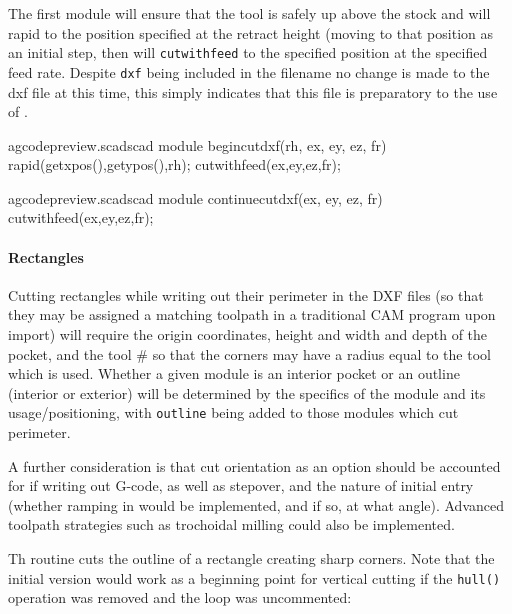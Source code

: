 \documentclass{ltxdoc}
\begin{document}
The first module will ensure that the tool is safely up above
the stock and will rapid to the position specified at the retract height (moving to that 
position as an initial step, then will \texttt{cutwithfeed} to the specified position
at the specified feed rate. Despite \texttt{dxf} being included in the filename no change
is made to the dxf file at this time, this simply indicates that this file is preparatory to
the use of .

\lstset{firstnumber=\thegcpscad}
\begin{writecode}{a}{gcodepreview.scad}{scad}
module begincutdxf(rh, ex, ey, ez, fr) {
  rapid(getxpos(),getypos(),rh);
  cutwithfeed(ex,ey,ez,fr);
}

\end{writecode}
\addtocounter{gcpscad}{5}
 
\lstset{firstnumber=\thegcpscad}
\begin{writecode}{a}{gcodepreview.scad}{scad}
module continuecutdxf(ex, ey, ez, fr) {
  cutwithfeed(ex,ey,ez,fr);
}

\end{writecode}
\addtocounter{gcpscad}{4}

\paragraph{Rectangles}

Cutting rectangles while writing out their perimeter in the DXF files (so that they may
be assigned a matching toolpath in a traditional CAM program upon import) will require
the origin coordinates, height and width and depth of the pocket, and the tool \# so
that the corners may have a radius equal to the tool which is used. Whether a given module
is an interior pocket or an outline (interior or exterior) will be determined by the
specifics of the module and its usage/positioning, with \texttt{outline} being added to 
those modules which cut perimeter.

A further consideration is that cut orientation as an option should be accounted for
if writing out G-code, as well as stepover, and the nature of initial
entry (whether ramping in would be implemented, and if so, at what angle). Advanced 
toolpath strategies such as trochoidal milling could also be implemented.

Th routine %
cuts the outline of a rectangle creating sharp corners. Note that the initial 
version would work as a beginning point for vertical cutting if the \texttt{hull()} operation 
was removed and the loop was uncommented:
 
\end{document}
